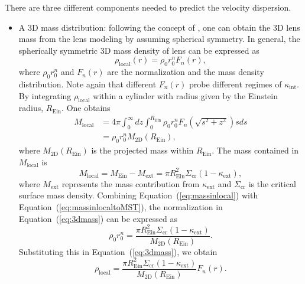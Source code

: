 \documentclass[useAMS,usenatbib]{mnras}
\newcommand{\eref}[1]{Equation~(\ref{#1})}
\begin{document}
There are three different components needed to predict the velocity dispersion.
\begin{itemize}
    \item A 3D mass distribution: following the concept of \citet{SuyuEtal10}, one can obtain the 3D lens mass from the lens modeling by assuming spherical symmetry. 
    In general, the spherically symmetric 3D mass density of lens can be expressed as
    \begin{equation}
    \label{eq:3dmass}
    \rho_{\textrm{local}}(r)=\rho_{0}r_{0}^{n}F_{n}(r),
    \end{equation}
    where $\rho_{0}r_{0}^{n}$ and $F_{n}(r)$ are the normalization and the mass density distribution. 
    Note again that different $F_{n}(r)$ probe different regimes of $\kappa_{\textrm{int}}$.
    By integrating $\rho_{\textrm{local}}$ within a cylinder with radius given by the Einstein radius, $R_{\textrm{Ein}}$. 
    One obtains
    \begin{equation}
    \label{eq:massinlocal}
    \begin{split}
        M_{\textrm{local}}&=4\pi\int^{\infty}_{0}dz\int^{R_{\textrm{Ein}}}_{0}\rho_{0}r_{0}^{n}F_{n}(\sqrt{s^{2}+z^{2}})sds\\
        &=\rho_{0}r_{0}^{n}M_{\textrm{2D}}(R_{\textrm{Ein}}),
    \end{split}
    \end{equation}
    where $M_{\textrm{2D}}(R_{\textrm{Ein}})$ is the projected mass within $R_{\textrm{Ein}}$.
    The mass contained in $M_{\textrm{local}}$ is
    \begin{equation}
    \label{eq:massinlocaltoMST}
    M_{\textrm{local}}=M_{\textrm{Ein}}-M_{\textrm{ext}}=\pi R_{\textrm{Ein}}^{2}\Sigma_{\textrm{cr}}(1-\kappa_{\textrm{ext}}),
    \end{equation}
    where $M_{\textrm{ext}}$ represents the mass contribution from $\kappa_{\textrm{ext}}$ and $\Sigma_{\textrm{cr}}$ is the critical surface mass density.
    Combining \eref{eq:massinlocal} with \eref{eq:massinlocaltoMST}, the normalization in \eref{eq:3dmass} can be expressed as
    \begin{equation}
    \label{eq:norm}
    \rho_{0}r_{0}^{n}=\frac{\pi R_{\textrm{Ein}}^{2}\Sigma_{\textrm{cr}}(1-\kappa_{\textrm{ext}})}{M_{\textrm{2D}}(R_{\textrm{Ein}})}.
    \end{equation}
    Substituting this in \eref{eq:3dmass}, we obtain
    \begin{equation}
    \label{eq:localdensity}
    \rho_{\textrm{local}}=\frac{\pi R_{\textrm{Ein}}^{2}\Sigma_{\textrm{cr}}(1-\kappa_{\textrm{ext}})}{M_{\textrm{2D}}(R_{\textrm{Ein}})}F_{n}(r).

\end{equation}
\end{itemize}
\end{document}
